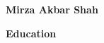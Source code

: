 \documentclass[11pt]{psuthesis}
\begin{document}
\begin{singlespace}
%





\vita
\Large
\vspace*{-0.4truein}
\centerline{{\bf Mirza Akbar Shah}}

\medskip

\large
\centerline{{\bf Education}}
\normalsize

\smallskip


\end{singlespace}
\end{document}
